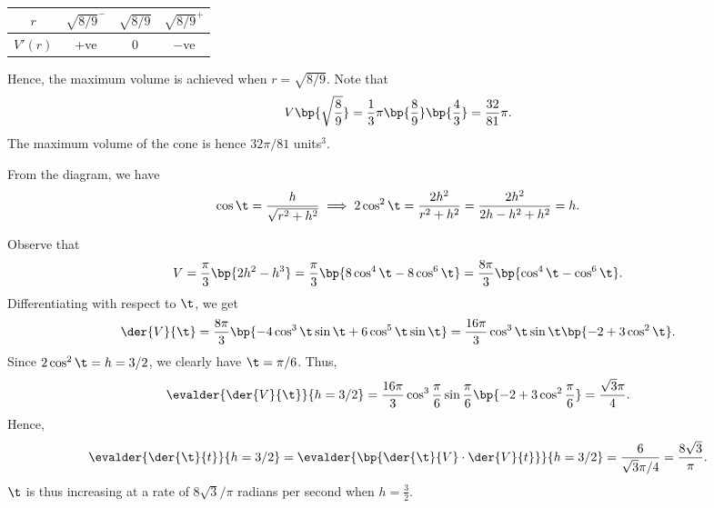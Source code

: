 \begin{solution}
\begin{ppart}
        \begin{table}[H]
            \centering
            \begin{tabular}{|c|c|c|c|}
            \hline
            $r$ & $\sqrt{8/9}^-$ & $\sqrt{8/9}$ & $\sqrt{8/9}^+$ \\\hline
            $V'(r)$ & +ve   & 0 & $-$ve   \\\hline
            \end{tabular}
        \end{table}

        Hence, the maximum volume is achieved when $r = \sqrt{8/9}$. Note that \[V\bp{\sqrt{\frac89}} = \frac13 \pi \bp{\frac89}\bp{\frac43} = \frac{32}{81}\pi.\] The maximum volume of the cone is hence $32\pi/81$ units$^3$.
    \end{ppart}
    \begin{ppart}
        From the diagram, we have \[\cos\t = \frac{h}{\sqrt{r^2 + h^2}} \implies 2\cos^2 \t = \frac{2h^2}{r^2 + h^2} = \frac{2h^2}{2h - h^2 + h^2} = h.\]

        Observe that \[V = \frac\pi3 \bp{2h^2 - h^3} = \frac\pi3 \bp{8\cos^4 \t - 8\cos^6 \t} = \frac{8\pi}3 \bp{\cos^4 \t - \cos^6 \t}.\] Differentiating with respect to $\t$, we get \[\der{V}{\t} = \frac{8\pi}3 \bp{-4\cos^3 \t \sin \t + 6\cos^5 \t \sin \t} = \frac{16\pi}3 \cos^3 \t \sin \t \bp{-2 + 3 \cos^2 \t}.\] Since $2\cos^2 \t = h = 3/2$, we clearly have $\t = \pi/6$. Thus, \[\evalder{\der{V}{\t}}{h = 3/2} = \frac{16\pi}3 \cos^3 \frac\pi6 \sin \frac\pi6 \bp{-2 + 3\cos^2 \frac\pi6} = \frac{\sqrt 3 \pi}4.\] Hence, \[\evalder{\der{\t}{t}}{h = 3/2} = \evalder{\bp{\der{\t}{V} \cdot \der{V}{t}}}{h = 3/2} = \frac{6}{\sqrt3 \pi /4} = \frac{8\sqrt3}{\pi}.\] $\t$ is thus increasing at a rate of $8\sqrt3/\pi$ radians per second when $h = \frac32$.
    \end{ppart}
\end{solution}

